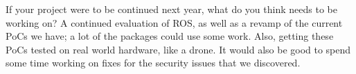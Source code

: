 \documentclass[IEEEtran,letterpaper,10pt,notitlepage,draftclsnofoot,onecolumn]{article}
\begin{document}
                                                        If your project were to be continued next year, what do you think needs to be working on? A continued evaluation of ROS, as well as a revamp of the current PoCs we have; a lot of the packages could use some work. Also, getting these PoCs tested on real world hardware, like a drone. It would also be good to spend some time working on fixes for the security issues that we discovered.
\end{document}
